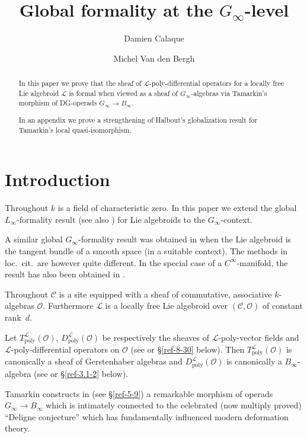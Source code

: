 \documentclass{amsart}
\author{Damien Calaque}
\author{Michel Van den Bergh}
\title{Global formality at the $G_\infty$-level}
\numberwithin{equation}{section}
\let\cal\mathcal
\theoremstyle{definition}
\theoremstyle{remark}
\begin{document}
\begin{abstract}
In this paper we prove that the sheaf of ${{\cal L}}$-poly-differential operators
for a locally free Lie algebroid ${{\cal L}}$ is formal when viewed
as a sheaf of $G_\infty$-algebras via Tamarkin's morphism of DG-operads
$G_\infty\rightarrow B_\infty$.

In an appendix  we prove a strengthening of Halbout's globalization
result for Tamarkin's local quasi-isomorphism. 
\end{abstract}

\maketitle

\setcounter{tocdepth}{1}

\tableofcontents

\section{Introduction}

Throughout $k$ is a field of characteristic zero. In this paper we
extend the global $L_\infty$-formality result \cite[Thm
7.4.1]{vdbcalaque} (see also \cite{ye3}) for Lie algebroids to the
$G_\infty$-context.  

A similar global $G_\infty$-formality result was obtained in
\cite{dtt} when the Lie algebroid is the tangent bundle of a smooth
space (in a suitable context). The methods in loc.\ cit.\ are however
quite different. In the special case of a $C^\infty$-manifold, 
 the result has also been obtained in \cite{GH}.

Throughout ${{\cal C}}$ is a site equipped with a sheaf of commutative,
associative $k$-algebras ${{\cal O}}$.  Furthermore ${{\cal L}}$ is a locally
free Lie algebroid over $({{\cal C}},{{\cal O}})$ of constant rank~$d$.

Let $T_{\operatorname{poly}}^{{\cal L}}({{\cal O}})$, $D_{\operatorname{poly}}^{{\cal L}}({{\cal O}})$ be respectively
the sheaves of ${{\cal L}}$-poly-vector fields and
${{\cal L}}$-poly-differential operators on ${{\cal O}}$ (see \cite{cal} or
\S\ref{ref-8-30} below). Then $T_{\operatorname{poly}}^{{\cal L}}({{\cal O}})$ is canonically a sheaf of
Gerstenhaber algebras and $D_{\operatorname{poly}}^{{\cal L}}({{\cal O}})$ is canonically a
$B_\infty$-algebra (see \cite{VG} or \S\ref{ref-3.1-2} below).  

Tamarkin constructs  in \cite{Tamarkin} (see \S\ref{ref-5-9})
a remarkable morphism of operads $G_\infty\rightarrow B_\infty$ which is
intimately connected to the celebrated (now multiply proved)
``Deligne conjecture'' \cite{De4} which has fundamentally influenced modern
deformation theory.
\end{document}
